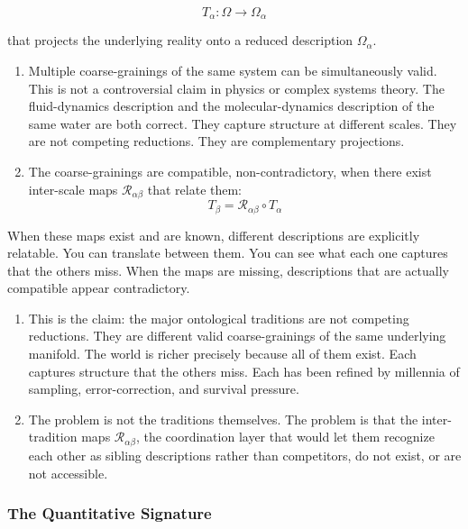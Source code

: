 \documentclass[
]{article}
\providecommand{\tightlist}{%
  \setlength{\itemsep}{0pt}\setlength{\parskip}{0pt}}
\begin{document}
\[T_\alpha : \Omega \to \Omega_\alpha\]

that projects the underlying reality onto a reduced description
\(\Omega_\alpha\).

\begin{enumerate}
\def\labelenumi{\arabic{enumi}.}
\setcounter{enumi}{4}
\tightlist
\item
  Multiple coarse-grainings of the same system can be simultaneously
  valid. This is not a controversial claim in physics or complex systems
  theory. The fluid-dynamics description and the molecular-dynamics
  description of the same water are both correct. They capture structure
  at different scales. They are not competing reductions. They are
  complementary projections.
\item
  The coarse-grainings are compatible, non-contradictory, when there
  exist inter-scale maps \(\mathcal{R}_{\alpha\beta}\) that relate them:
  \[T_\beta = \mathcal{R}_{\alpha\beta} \circ T_\alpha\]
\end{enumerate}

When these maps exist and are known, different descriptions are
explicitly relatable. You can translate between them. You can see what
each one captures that the others miss. When the maps are missing,
descriptions that are actually compatible appear contradictory.

\begin{enumerate}
\def\labelenumi{\arabic{enumi}.}
\setcounter{enumi}{6}
\tightlist
\item
  This is the claim: the major ontological traditions are not competing
  reductions. They are different valid coarse-grainings of the same
  underlying manifold. The world is richer precisely because all of them
  exist. Each captures structure that the others miss. Each has been
  refined by millennia of sampling, error-correction, and survival
  pressure.
\item
  The problem is not the traditions themselves. The problem is that the
  inter-tradition maps \(\mathcal{R}_{\alpha\beta}\), the coordination
  layer that would let them recognize each other as sibling descriptions
  rather than competitors, do not exist, or are not accessible.
\end{enumerate}

\subsubsection{The Quantitative
Signature}\label{the-quantitative-signature}
\end{document}

